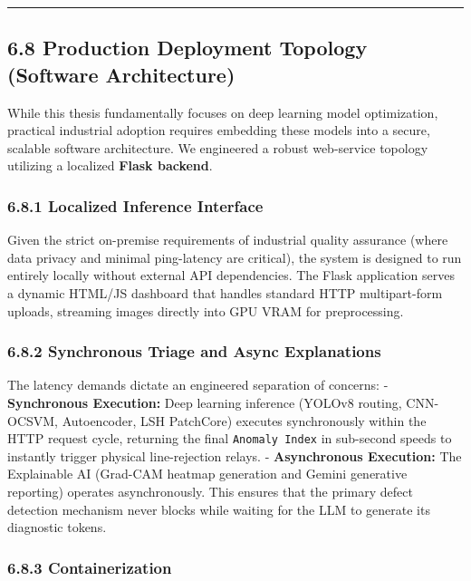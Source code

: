 \begin{center}\rule{0.5\linewidth}{0.5pt}\end{center}

\subsection{6.8 Production Deployment Topology (Software Architecture)}\label{production-deployment-topology-software-architecture}

While this thesis fundamentally focuses on deep learning model optimization, practical industrial adoption requires embedding these models into a secure, scalable software architecture. We engineered a robust web-service topology utilizing a localized \textbf{Flask backend}.

\subsubsection{6.8.1 Localized Inference Interface}\label{localized-inference-interface}

Given the strict on-premise requirements of industrial quality assurance (where data privacy and minimal ping-latency are critical), the system is designed to run entirely locally without external API dependencies. The Flask application serves a dynamic HTML/JS dashboard that handles standard HTTP multipart-form uploads, streaming images directly into GPU VRAM for preprocessing.

\subsubsection{6.8.2 Synchronous Triage and Async Explanations}\label{synchronous-triage-and-async-explanations}

The latency demands dictate an engineered separation of concerns: - \textbf{Synchronous Execution:} Deep learning inference (YOLOv8 routing, CNN-OCSVM, Autoencoder, LSH PatchCore) executes synchronously within the HTTP request cycle, returning the final \texttt{Anomaly\ Index} in sub-second speeds to instantly trigger physical line-rejection relays. - \textbf{Asynchronous Execution:} The Explainable AI (Grad-CAM heatmap generation and Gemini generative reporting) operates asynchronously. This ensures that the primary defect detection mechanism never blocks while waiting for the LLM to generate its diagnostic tokens.

\subsubsection{6.8.3 Containerization}\label{containerization}

